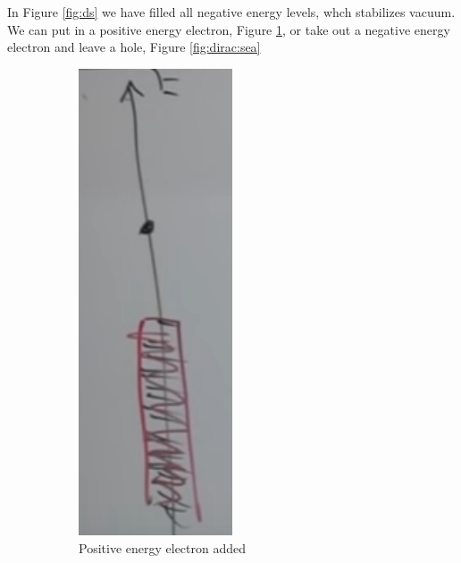 \documentclass[]{article}
\begin{document}
In Figure \ref{fig:ds} we have filled all negative energy levels, whch stabilizes vacuum. We can put in a positive energy electron, Figure \ref{fig:aqm-10-dirac-sea}, or take out a negative energy electron and leave a hole, Figure \ref{fig:dirac:sea}
\begin{figure}[H]
	\begin{center}
		\caption{The Dirac Sea}\label{fig:ds}
		\begin{subfigure}[t]{0.3\textwidth}
			\begin{center}
				\caption{Positive energy electron added}\label{fig:aqm-10-dirac-sea}
				\includegraphics[width=0.5\textwidth]{aqm-10-dirac-sea}
			\end{center}
		\end{subfigure}
		\begin{subfigure}[t]{0.3\textwidth}

\end{subfigure}
\end{center}
\end{figure}
\end{document}
